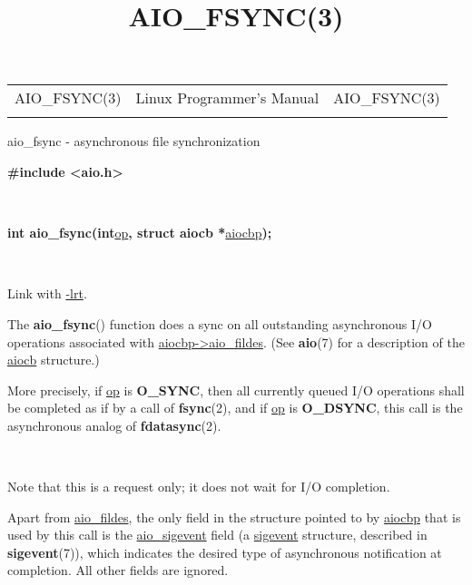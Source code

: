 \documentclass[]{article}
\title{AIO\_FSYNC(3)}
\author{}
\date{}
\let\realtextbf=\textbf
\renewcommand{\textbf}[1]{\textcolor{boldcolor}{\realtextbf{#1}}}
\renewcommand{\emph}[1]{\underline{#1}}
\begin{document}
\maketitle

\begin{longtable}[c]{@{}lll@{}}
\toprule\addlinespace
AIO\_FSYNC(3) & Linux Programmer's Manual & AIO\_FSYNC(3)
\\\addlinespace
\bottomrule
\end{longtable}


aio\_fsync - asynchronous file synchronization


\textbf{\#include \textless{}aio.h\textgreater{}}

~

\textbf{int aio\_fsync(int}\emph{op}\textbf{, struct aiocb
*}\emph{aiocbp}\textbf{);}

~

Link with \emph{-lrt}.


The \textbf{aio\_fsync}() function does a sync on all outstanding
asynchronous I/O operations associated with
\emph{aiocbp-\textgreater{}aio\_fildes}. (See \textbf{aio}(7) for a
description of the \emph{aiocb} structure.)

More precisely, if \emph{op} is \textbf{O\_SYNC}, then all currently
queued I/O operations shall be completed as if by a call of
\textbf{fsync}(2), and if \emph{op} is \textbf{O\_DSYNC}, this call is
the asynchronous analog of \textbf{fdatasync}(2).

~

Note that this is a request only; it does not wait for I/O completion.

Apart from \emph{aio\_fildes}, the only field in the structure pointed
to by \emph{aiocbp} that is used by this call is the
\emph{aio\_sigevent} field (a \emph{sigevent} structure, described in
\textbf{sigevent}(7)), which indicates the desired type of asynchronous
notification at completion. All other fields are ignored.
\end{document}
